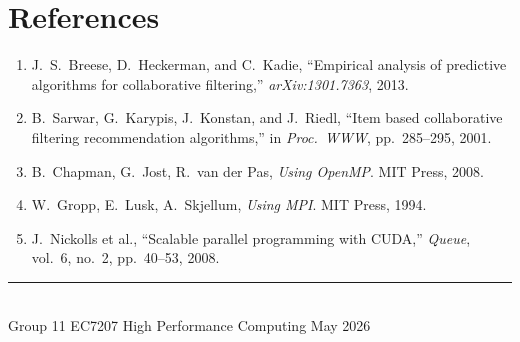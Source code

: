 \documentclass[11pt,a4paper]{article}
\begin{document}
\section*{References}

\begingroup\sloppy
\begin{enumerate}
  \item J.\ S.\ Breese, D.\ Heckerman, and C.\ Kadie,
        ``Empirical analysis of predictive algorithms for collaborative filtering,''
        \textit{arXiv:1301.7363}, 2013.
  \item B.\ Sarwar, G.\ Karypis, J.\ Konstan, and J.\ Riedl,
        ``Item based collaborative filtering recommendation algorithms,''
        in \textit{Proc.\ WWW}, pp.\ 285--295, 2001.
  \item B.\ Chapman, G.\ Jost, R.\ van der Pas, \textit{Using OpenMP}. MIT Press, 2008.
  \item W.\ Gropp, E.\ Lusk, A.\ Skjellum, \textit{Using MPI}. MIT Press, 1994.
  \item J.\ Nickolls et al., ``Scalable parallel programming with CUDA,''
        \textit{Queue}, vol.\ 6, no.\ 2, pp.\ 40--53, 2008.
\end{enumerate}
\endgroup

\vfill
\noindent\rule{\linewidth}{0.5pt}\\[0.3em]
{\small Group 11 \quad EC7207 High Performance Computing \quad May 2026}
\end{document}
